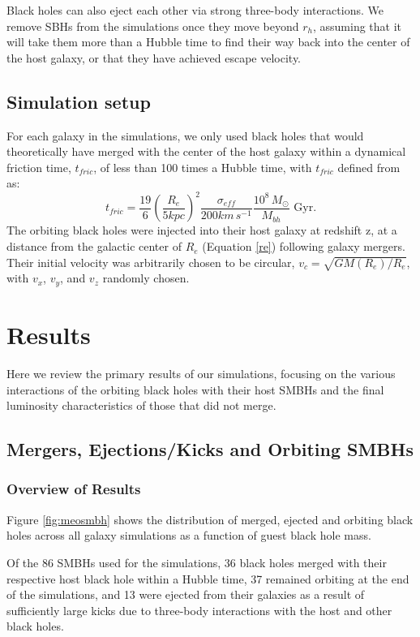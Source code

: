 \documentclass[english, backref,breaklinks,colorlinks,citecolor=blue, usenatbib]{mnras}
\begin{document}
Black holes can also eject each other via strong three-body interactions. We remove SBHs from the simulations once they move beyond $r_h$, assuming that it will take them more than a Hubble time to find their way back into the center of the host galaxy, or that they have achieved escape velocity.

\subsection{Simulation setup}
For each galaxy in the simulations, we only used black holes that would theoretically have merged with the center of the host galaxy within a dynamical friction time, $t_{fric}$, of less than 100 times a Hubble time, with $t_{fric}$ defined from \citet{2008gady.book.....B} as:
\begin{equation}\label{tfric}
    t_{fric} = \frac{19}{6}\left(\frac{R_e}{5kpc}\right)^2\frac{\sigma_{eff}}{200km\,s^{-1}}\frac{10^8\,M_{\odot}}{M_{bh}} \text{  Gyr}.
\end{equation}
The orbiting black holes were injected into their host galaxy at redshift z, at a distance from the galactic center of $R_{e}$ (Equation \ref{re}) following galaxy mergers.  Their initial velocity was arbitrarily chosen to be circular, $v_c = \sqrt{GM(R_e)/R_e}$, with $v_x$, $v_y$, and $v_z$ randomly chosen.

\section{Results}\label{sec:results}
Here we review the primary results of our simulations, focusing on the various interactions of the orbiting black holes with their host SMBHs and the final luminosity characteristics of those that did not merge.

\subsection{Mergers, Ejections/Kicks and Orbiting SMBHs}

\subsubsection{Overview of Results}\label{sec:results_overview}
Figure \ref{fig:meosmbh} shows the distribution of merged, ejected and orbiting black holes across all galaxy simulations as a function of guest black hole mass.

Of the 86 SMBHs used for the simulations, 36 black holes merged with their respective host black hole within a Hubble time, 37 remained orbiting at the end of the simulations, and 13 were ejected from their galaxies as a result of sufficiently large kicks due to three-body interactions with the host and other black holes.
\end{document}
